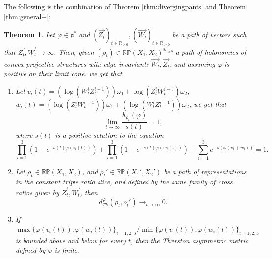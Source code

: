 \documentclass{amsart}
\newtheorem{thm}{Theorem}[section]
\theoremstyle{remark}
\theoremstyle{definition}
\begin{document}
The following is the combination of Theorem \ref{thm:divergingpants} and Theorem \ref{thm:general+}:

\begin{thm}
  \label{thm:sl3}
 Let $\varphi \in \mathfrak{a}^*$ and $(\vec{Z_t})_{t \in \mathbb{R}_{\geq 0}}, (\vec{W_t})_{t \in \mathbb{R}_{\geq 0}}$ be a path of vectors such that $\vec{Z_t},\vec{W_t} \to \infty$.
 Then, given $(\rho_t) \in \mathbb{RP}(X_1, X_2)^{\mathbb{R}_{\geq 0}}$ a path of holonomies of convex projective structures with edge invariants $\vec{W_t},\vec{Z_t}$, and assuming $\varphi$ is positive on their limit cone, we get that
   \begin{enumerate}
      \item Let $v_i (t) = (\log (W^i_t Z^{i-1}_t)) \omega_1 + \log (Z^i_t W^{i-1}_t) \omega_2$, $w_i (t) = (\log (Z^i_t W^{i-1}_t)) \omega_1 + (\log (W^i_t Z^{i-1}_t)) \omega_2$, we get that
         $$\lim_{t \to \infty }\frac{h_{\rho_t} (\varphi)}{s(t)} =1,$$
 where $s(t)$ is a positive solution to the equation
         $$\prod_{i=1}^3 (1-e^{-s (t) \varphi (v_i (t))}) + \prod_{i=1}^3 (1-e^{-s (t) \varphi (w_i (t))}) + \sum_{i=1}^3 e^{-s (\varphi (v_i + w_i))} =1.$$
      \item Let $\rho_t \in \mathbb{RP} (X_1, X_2)$, and $\rho_t' \in \mathbb{RP} (X_1', X_2')$ be a path of representations in the constant triple ratio slice, and defined by the same family of cross ratios given by $\vec{Z_t},\vec{W_t}$, then
      $$d_{Th}^\varphi (\rho_t,\rho_t') \to_{t \to \infty} 0.$$
      \item If $\max \{\varphi (v_i (t)),\varphi (w_i (t))\}_{i=1,2,3}/\min \{\varphi (v_i (t)),\varphi (w_i (t))\}_{i=1,2,3}$ is bounded above and below for every $t$, then the Thurston asymmetric metric defined by $\varphi$ is finite.
   \end{enumerate}
\end{thm}
\end{document}
